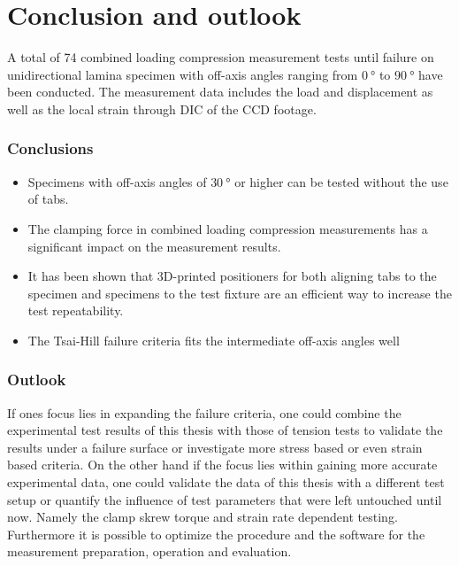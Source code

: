 \chapter{Conclusion and outlook}
\label{chap:\currfilebase}

A total of 74 combined loading compression measurement tests until failure on unidirectional lamina specimen with off-axis angles ranging from $\SI{0}{\degree}$ to $\SI{90}{\degree}$ have been conducted. The measurement data includes the load and displacement as well as the local strain through DIC of the CCD footage.

\subsection*{Conclusions}
\begin{itemize}
    \item Specimens with off-axis angles of $\SI{30}{\degree}$ or higher can be tested without the use of tabs.
    \item The clamping force in combined loading compression measurements has a significant impact on the measurement results.
    \item It has been shown that 3D-printed positioners for both aligning tabs to the specimen and specimens to the test fixture are an efficient way to increase the test repeatability.
    \item The Tsai-Hill failure criteria fits the intermediate off-axis angles well
\end{itemize}

\subsection*{Outlook}
If ones focus lies in expanding the failure criteria, one could combine the experimental test results of this thesis with those of tension tests to validate the results under a failure surface or investigate more stress based or even strain based criteria. On the other hand if the focus lies within gaining more accurate experimental data, one could validate the data of this thesis with a different test setup or quantify the influence of test parameters that were left untouched until now. Namely the clamp skrew torque and strain rate dependent testing. Furthermore it is possible to optimize the procedure and the software for the measurement preparation, operation and evaluation.

